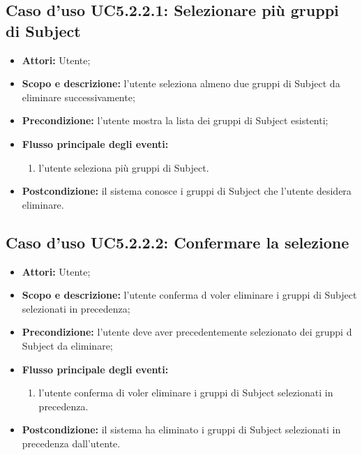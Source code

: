 \subsection{Caso d'uso UC5.2.2.1: Selezionare più gruppi di Subject}
\begin{itemize}
\item \textbf{Attori:} Utente;
\item \textbf{Scopo e descrizione:} l'utente seleziona almeno due gruppi di Subject\glossario{} da eliminare successivamente;
\item \textbf{Precondizione:} l'utente mostra la lista dei gruppi di Subject\glossario{} esistenti;
\item \textbf{Flusso principale degli eventi:}
\begin{enumerate}
\item l'utente seleziona più gruppi di Subject\glossario{}.
\end{enumerate}
\item \textbf{Postcondizione:} il sistema conosce i gruppi di Subject\glossario{} che l'utente desidera eliminare.
\end{itemize} 

\subsection{Caso d'uso UC5.2.2.2: Confermare la selezione}
\begin{itemize}
\item \textbf{Attori:} Utente;
\item \textbf{Scopo e descrizione:} l'utente conferma d voler eliminare i gruppi di Subject\glossario{} selezionati in precedenza;
\item \textbf{Precondizione:} l'utente deve aver precedentemente selezionato dei gruppi d Subject\glossario{} da eliminare;
\item \textbf{Flusso principale degli eventi:}
\begin{enumerate}
\item l'utente conferma di voler eliminare i gruppi di Subject\glossario{} selezionati in precedenza.
\end{enumerate}
\item \textbf{Postcondizione:} il sistema ha eliminato i gruppi di Subject\glossario{} selezionati in precedenza dall'utente.
\end{itemize}

